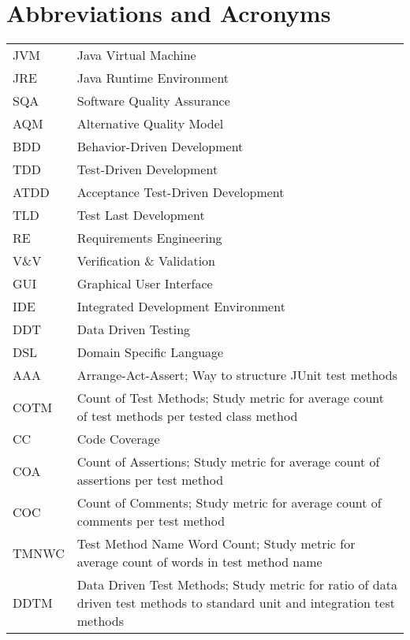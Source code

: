 \chapter*{Abbreviations and Acronyms}


\noindent
\begin{longtable}{@{}p{}p{}@{}}
JVM & Java Virtual Machine \\
JRE & Java Runtime Environment \\
SQA & Software Quality Assurance \\
AQM & Alternative Quality Model \\
BDD & Behavior-Driven Development \\
TDD & Test-Driven Development \\
ATDD & Acceptance Test-Driven Development \\
TLD & Test Last Development \\
RE & Requirements Engineering \\
V\&V & Verification \& Validation \\
GUI & Graphical User Interface \\
IDE & Integrated Development Environment \\
DDT & Data Driven Testing \\
DSL & Domain Specific Language \\
AAA & Arrange-Act-Assert; Way to structure JUnit test methods \\
COTM & Count of Test Methods; Study metric for average count of test methods per tested class method \\
CC & Code Coverage \\
COA & Count of Assertions; Study metric for average count of assertions per test method \\
COC & Count of Comments; Study metric for average count of comments per test method \\
TMNWC & Test Method Name Word Count; Study metric for average count of words in test method name \\
DDTM & Data Driven Test Methods; Study metric for ratio of data driven test methods to standard unit and integration test methods \\
\end{longtable}
